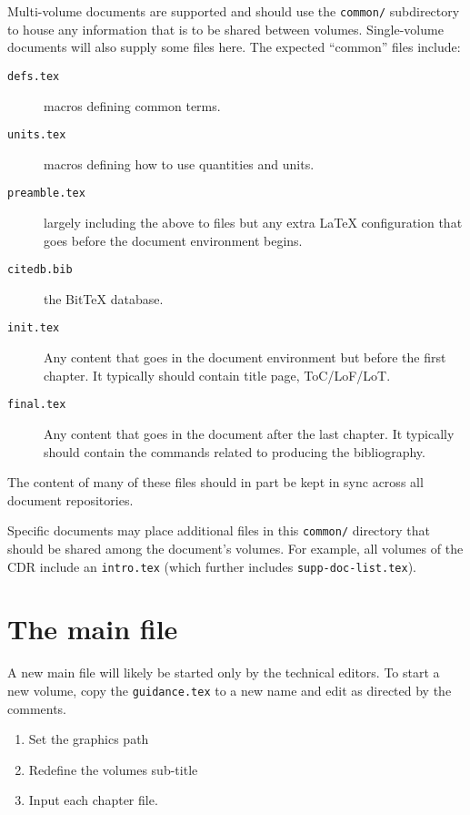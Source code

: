 Multi-volume documents are supported and should use the
\texttt{common/} subdirectory to house any information that is to be
shared between volumes.
Single-volume documents will also supply some files here.
The expected ``common'' files include:
\begin{description}
\item[\texttt{defs.tex}] macros defining common terms.
\item[\texttt{units.tex}] macros defining how to use quantities and units.
\item[\texttt{preamble.tex}] largely including the above to files but
  any extra \LaTeX{} configuration that goes before the document
  environment begins.
\item[\texttt{citedb.bib}] the BitTeX database.
\item[\texttt{init.tex}] Any content that goes in the document
  environment but before the first chapter.
  It typically should contain title page, ToC/LoF/LoT.
\item[\texttt{final.tex}] Any content that goes in the document after
  the last chapter.
  It typically should contain the commands related to producing the
  bibliography.
\end{description}

The content of many of these files should in part be kept in sync
across all document repositories.

Specific documents may place additional files in this \texttt{common/}
directory that should be shared among the document's volumes.
For example, all volumes of the CDR include an \texttt{intro.tex}
(which further includes \texttt{supp-doc-list.tex}).

\section{The main file}

A new main file will likely be started only by the technical editors.
To start a new volume, copy the \texttt{guidance.tex} to a new
name and edit as directed by the comments.  

\begin{enumerate}
\item Set the graphics path
\item Redefine the volumes sub-title
\item Input each chapter file.
\end{enumerate}

